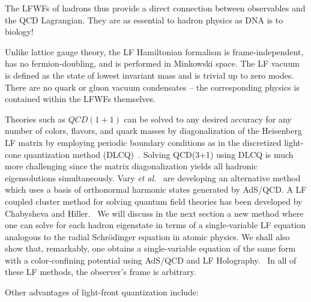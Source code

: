 \documentclass[prd,aps,onecolumn,nofootinbib]{revtex4}
\begin{document}
The LFWFs of hadrons thus provide a direct connection between observables and the QCD Lagrangian. They are as essential to hadron physics as DNA is to biology!

Unlike lattice gauge theory, the LF Hamiltonian formalism is  frame-independent, has no fermion-doubling, and is performed in Minkowski space.   The LF vacuum is defined as the state of lowest invariant mass and is trivial up to zero modes.  There are no quark or gluon vacuum condensates -- the corresponding physics is contained within the 
LFWFs themselves.~\cite{Brodsky:2009zd,Brodsky:2010xf}




Theories such as $QCD(1+1) $ can be solved to any desired accuracy for any number of colors, flavors, and quark masses by diagonalization of the Heisenberg LF matrix by employing periodic boundary conditions as in the discretized light-cone quantization method (DLCQ)~\cite{Pauli:1985ps,Hornbostel:1988fb}.  Solving QCD(3+1) using  DLCQ is much more challenging since the matrix diagonalization yields all hadronic eigensolutions simultaneously.  Vary {\it et al.}~\cite{Vary:2009gt} are developing an alternative method which uses a basis of orthonormal harmonic states generated by AdS/QCD.   A LF coupled cluster  method for solving quantum field theories has been developed by Chabysheva and Hiller.~\cite{Chabysheva:2011ed}
We will discuss in the next section a new method where one can solve for  each hadron eigenstate  in terms of a single-variable LF equation analogous to the radial Schr\"odinger equation in atomic physics.  
We shall also show that, remarkably, one obtains a single-variable equation of the same form with a color-confining potential using AdS/QCD and LF 
Holography.~\cite{deTeramond:2008ht}  In all of these LF methods, the observer's frame is arbitrary.
  
  
  
Other advantages of light-front quantization include:
\end{document}
